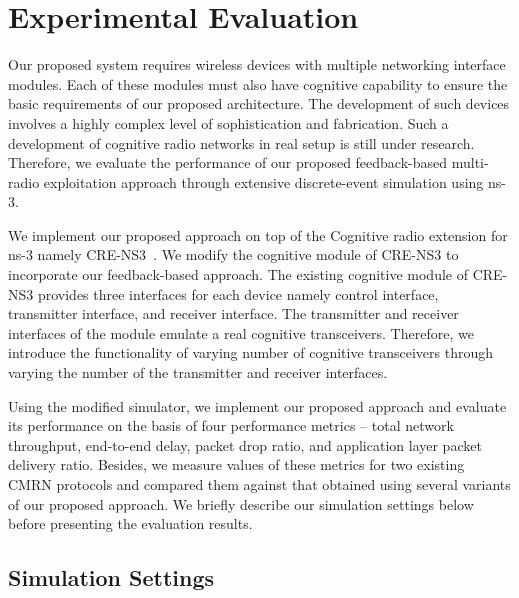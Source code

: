 \chapter{Experimental Evaluation}
\label{chap:results}

Our proposed system requires wireless devices with multiple networking interface modules. Each of these modules must also have cognitive capability to ensure the basic requirements of our proposed architecture. The development of such devices involves a highly complex level of sophistication and fabrication. Such a development of cognitive radio networks in real setup is still under research. Therefore, we evaluate the performance of our proposed feedback-based multi-radio exploitation approach through extensive discrete-event simulation using ns-3.

We implement our proposed approach on top of the Cognitive radio extension for ns-3 namely CRE-NS3~\cite{al2014simulating}. We modify the cognitive module of CRE-NS3 to incorporate our feedback-based approach. The existing cognitive module of CRE-NS3 provides three interfaces for each device namely control interface, transmitter interface, and receiver interface. The transmitter and receiver interfaces of the module emulate a real cognitive transceivers. Therefore, we introduce the functionality of varying number of cognitive transceivers through varying the number of the transmitter and receiver interfaces.

Using the modified simulator, we implement our proposed approach and evaluate its performance on the basis of four performance metrics -- total network throughput, end-to-end delay, packet drop ratio, and application layer packet delivery ratio. Besides, we measure values of these metrics for two existing CMRN protocols and compared them against that obtained using several variants of our proposed approach. We briefly describe our simulation settings below before presenting the evaluation results.

\section{Simulation Settings}

